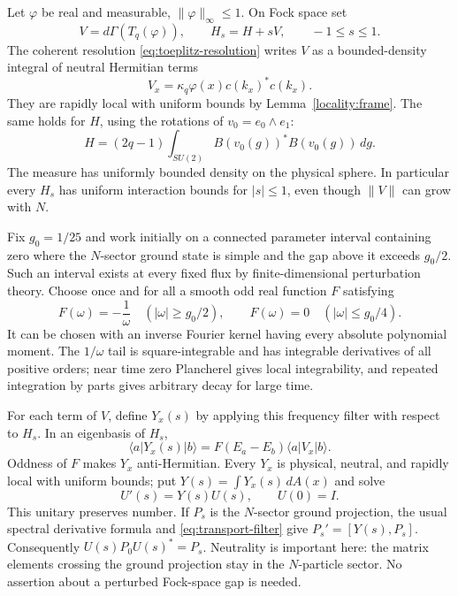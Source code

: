 Let $\varphi$ be real and measurable, $\|\varphi\|_\infty\le1$.
On Fock space set
\[
 V=d\Gamma(T_q(\varphi)),\qquad H_s=H+sV,
 \qquad -1\le s\le1.
\]
The coherent resolution \eqref{eq:toeplitz-resolution} writes $V$
as a bounded-density integral of neutral Hermitian terms
\[
 V_x=\kappa_q\varphi(x)c(k_x)^*c(k_x).
\]
They are rapidly local with uniform bounds by
Lemma~\ref{locality:frame}. The same holds for $H$, using the
rotations of $v_0=e_0\wedge e_1$:
\[
 H=(2q-1)\int_{SU(2)} B(v_0(g))^*B(v_0(g))\,dg.
\]
The measure has uniformly bounded density on the physical sphere.
In particular every $H_s$ has uniform interaction bounds for
$|s|\le1$, even though $\|V\|$ can grow with $N$.

Fix $g_0=1/25$ and work initially on a connected parameter interval
containing zero where the $N$-sector ground state is simple and the
gap above it exceeds $g_0/2$. Such an interval exists at every fixed
flux by finite-dimensional perturbation theory. Choose once and for
all a smooth odd real function $F$ satisfying
\begin{equation}\label{eq:transport-filter}
 F(\omega)=-\frac1\omega\quad (|\omega|\ge g_0/2),
 \qquad F(\omega)=0\quad (|\omega|\le g_0/4).
\end{equation}
It can be chosen with an inverse Fourier kernel having every absolute
polynomial moment. The $1/\omega$ tail is square-integrable and
has integrable derivatives of all positive orders; near time zero
Plancherel gives local integrability, and repeated integration by
parts gives arbitrary decay for large time.

For each term of $V$, define $Y_x(s)$ by applying this frequency
filter with respect to $H_s$. In an eigenbasis of $H_s$,
\begin{equation}\label{eq:transport-matrix-elements}
 \langle a|Y_x(s)|b\rangle
 =F(E_a-E_b)\langle a|V_x|b\rangle.
\end{equation}
Oddness of $F$ makes $Y_x$ anti-Hermitian. Every $Y_x$ is physical,
neutral, and rapidly local with uniform bounds; put
$Y(s)=\int Y_x(s)\,dA(x)$ and solve
\[
 U'(s)=Y(s)U(s),\qquad U(0)=I.
\]
This unitary preserves number. If $P_s$ is the $N$-sector ground
projection, the usual spectral derivative formula and
\eqref{eq:transport-filter} give $P_s'=[Y(s),P_s]$.
Consequently $U(s)P_0U(s)^*=P_s$. Neutrality is important here:
the matrix elements crossing the ground projection stay in the
$N$-particle sector. No assertion about a perturbed Fock-space gap
is needed.

